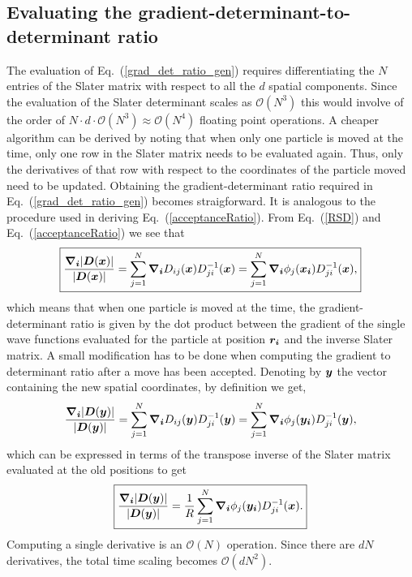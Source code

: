\subsection{Evaluating the gradient-determinant-to-determinant ratio}
The evaluation of Eq.~(\ref{grad_det_ratio_gen}) requires differentiating the $N$ entries of the Slater matrix with respect to all the $d$ spatial components. Since the evaluation of the Slater determinant scales as $\mathcal{O}(N^3)$ this would involve of the order of $N \cdot d \cdot \mathcal{O}(N^3) \approx \mathcal{O}(N^4)$ floating point operations. A cheaper algorithm can be derived by noting that when only one particle is moved at the time, 
only one row in the Slater matrix needs to be evaluated again. Thus, only the derivatives of that row with respect to the coordinates of the particle moved need to be updated. Obtaining the gradient-determinant ratio required in Eq.~(\ref{grad_det_ratio_gen}) becomes straigforward. It is analogous to the procedure used in deriving Eq.~(\ref{acceptanceRatio}). From Eq.~(\ref{RSD}) and Eq.~(\ref{acceptanceRatio}) we see that
\begin{equation}\label{gradDetRatioO}
\boxed{\frac{\boldsymbol{\nabla_i}|\boldsymbol{D}(\boldsymbol{x})|}{|\boldsymbol{D}(\boldsymbol{x})|} = \sum_{j=1}^{N} \boldsymbol{\nabla_i} D_{ij}(\boldsymbol{x}) D_{ji}^{-1}(\boldsymbol{x}) = \sum_{j=1}^{N} \boldsymbol{\nabla_i}\phi_j(\boldsymbol{x_i}) D_{ji}^{-1}(\boldsymbol{x}),}
\end{equation}
which means that when one particle is moved at the time, the gradient-determinant ratio is given by the dot product between the gradient of the single wave functions evaluated for the particle at position $\boldsymbol{r_i}$ and the inverse Slater matrix.
A small modification has to be done when computing the gradient to determinant ratio after a move has been accepted. Denoting by $\boldsymbol{y}$ the vector containing the new spatial coordinates, by definition we get,
$$
\frac{\boldsymbol{\nabla_i}|\boldsymbol{D}(\boldsymbol{y})|}{|\boldsymbol{D}(\boldsymbol{y})|} = \sum_{j=1}^{N} \boldsymbol{\nabla_i} D_{ij}(\boldsymbol{y}) D_{ji}^{-1}(\boldsymbol{y}) = \sum_{j=1}^{N} \boldsymbol{\nabla_i}\phi_j(\boldsymbol{y_i}) D_{ji}^{-1}(\boldsymbol{y}),
$$
which can be expressed in terms of the transpose inverse of the Slater matrix evaluated at the old positions\cite{Hammond} to get
\begin{equation}\label{gradDetRatioN}
\boxed{\frac{\boldsymbol{\nabla_i}|\boldsymbol{D}(\boldsymbol{y})|}{|\boldsymbol{D}(\boldsymbol{y})|} = \frac{1}{R} \sum_{j=1}^{N} \boldsymbol{\nabla_i}\phi_j(\boldsymbol{y_i}) D_{ji}^{-1}(\boldsymbol{x}).}
\end{equation}
Computing a single derivative is an $\mathcal{O}(N)$ operation. Since there are $dN$ derivatives, the total time scaling becomes $\mathcal{O}(dN^2)$.


